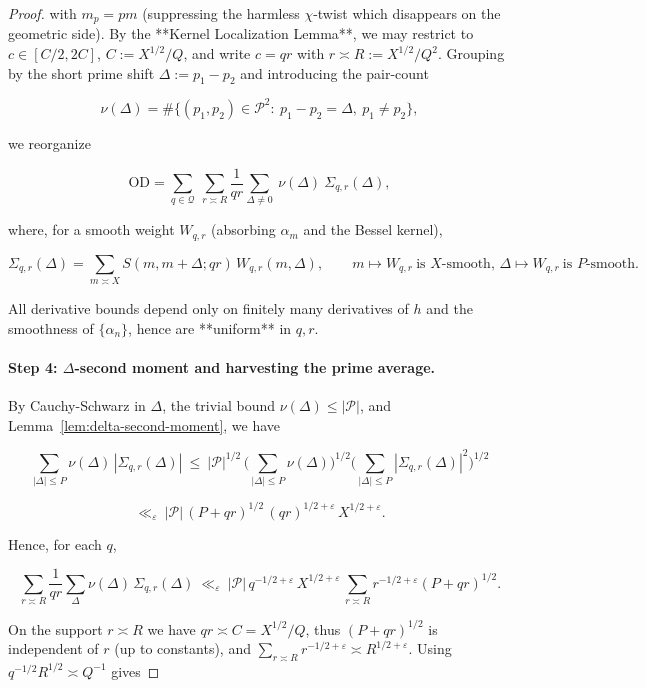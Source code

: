 \documentclass[11pt]{article}
\theoremstyle{definition}
\theoremstyle{remark}
\begin{document}
\begin{proof}
with $m_{p}=pm$ (suppressing the harmless $\chi$-twist which disappears on the geometric side). By the **Kernel Localization Lemma**, we may restrict to $c\in[C/2,2C]$, $C:=X^{1/2}/Q$, and write $c=qr$ with $r\asymp R:=X^{1/2}/Q^2$. Grouping by the short prime shift $\Delta:=p_1-p_2$ and introducing the pair-count

$$
\nu(\Delta)=\#\{(p_1,p_2)\in\mathcal P^2:\ p_1-p_2=\Delta,\ p_1\ne p_2\},
$$

we reorganize

$$
\mathrm{OD}
=\sum_{q\in\mathcal Q}\ \sum_{r\asymp R} \frac{1}{qr}
\sum_{\Delta\ne 0}\ \nu(\Delta)\ \Sigma_{q,r}(\Delta),
$$

where, for a smooth weight $W_{q,r}$ (absorbing $\alpha_m$ and the Bessel kernel),

$$
\Sigma_{q,r}(\Delta)=\sum_{m\asymp X} S(m,m+\Delta;qr)\,W_{q,r}(m,\Delta),
\qquad m\mapsto W_{q,r}\ \text{is }X\text{-smooth,\ } \Delta\mapsto W_{q,r}\ \text{is }P\text{-smooth}.
$$

All derivative bounds depend only on finitely many derivatives of $h$ and the smoothness of $\{\alpha_n\}$, hence are **uniform** in $q,r$.

\paragraph{Step 4: $\Delta$-second moment and harvesting the prime average.}

By Cauchy-Schwarz in $\Delta$, the trivial bound $\nu(\Delta)\le |\mathcal P|$, and Lemma~\ref{lem:delta-second-moment}, we have

$$
\sum_{|\Delta|\le P}\nu(\Delta)\,|\Sigma_{q,r}(\Delta)|
\ \le\ |\mathcal P|^{1/2}\,\Big(\sum_{|\Delta|\le P}\nu(\Delta)\Big)^{1/2}
\Big(\sum_{|\Delta|\le P}|\Sigma_{q,r}(\Delta)|^2\Big)^{1/2}
$$

$$
\ll_\varepsilon\ |\mathcal P|\,(P+qr)^{1/2}\,(qr)^{1/2+\varepsilon}\,X^{1/2+\varepsilon}.
$$

Hence, for each $q$,

$$
\sum_{r\asymp R}\frac{1}{qr}\sum_{\Delta}\nu(\Delta)\,\Sigma_{q,r}(\Delta)
\ \ll_\varepsilon\ |\mathcal P|\,q^{-1/2+\varepsilon}\,X^{1/2+\varepsilon}\,
\sum_{r\asymp R} r^{-1/2+\varepsilon}(P+qr)^{1/2}.
$$

On the support $r\asymp R$ we have $qr\asymp C=X^{1/2}/Q$, thus $(P+qr)^{1/2}$ is independent of $r$ (up to constants), and $\sum_{r\asymp R} r^{-1/2+\varepsilon}\asymp R^{1/2+\varepsilon}$. Using $q^{-1/2}R^{1/2}\asymp Q^{-1}$ gives


\end{proof}
\end{document}
